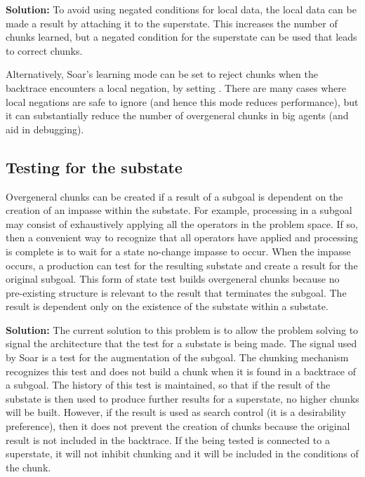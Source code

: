 \textbf{Solution:} To avoid using negated conditions for local data, the local
data can be made a result by attaching it to the superstate. This increases
the number of chunks learned, but a negated condition for the superstate can
be used that leads to correct chunks.

Alternatively, Soar's learning mode can be set to reject chunks when the
backtrace encounters a local negation, by setting . There are many cases where local negations
are safe to ignore (and hence this mode reduces performance), but it can
substantially reduce the number of overgeneral chunks in big agents (and aid in
debugging).


\subsection{Testing for the substate}

Overgeneral chunks can be created if a result of a subgoal is dependent on the
creation of an impasse within the substate. For example, processing in a
subgoal may consist of exhaustively applying all the operators in the problem
space. If so, then a convenient way to recognize that all operators have
applied and processing is complete is to wait for a state no-change impasse to
occur. When the impasse occurs, a production can test for the resulting
substate and create a result for the original subgoal. This form of state test
builds overgeneral chunks because no pre-existing structure is relevant to the
result that terminates the subgoal. The result is dependent only on the
existence of the substate within a substate.

\textbf{Solution:} The current solution to this problem is to allow the
problem solving to signal the architecture that the test for a substate is
being made.  The signal used by Soar is a test for the  augmentation of the subgoal.  The chunking mechanism recognizes this test
and does not build a chunk when it is found in a backtrace of a subgoal.  The
history of this test is maintained, so that if the result of the substate is
then used to produce further results for a superstate, no higher chunks will
be built.  However, if the result is used as search control (it is a
desirability preference), then it does not prevent the creation of chunks
because the original result is not included in the backtrace.  If the
 being tested is connected to a superstate, it will
not inhibit chunking and it will be included in the conditions of the chunk.

